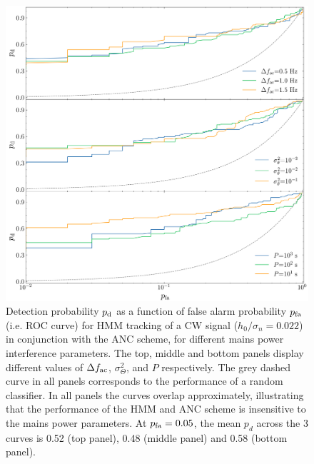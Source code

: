\documentclass[pra,superscriptaddress,reprint,amsmath,amssymb,nofootinbib]{revtex4-2}
\begin{document}
\begin{figure}
	\begin{center}
		\includegraphics[width=\columnwidth]{images/roc_curve_mains_power_params_log}
	\end{center}
	\caption{Detection probability $p_{\rm d}$ as a function of false alarm probability $p_{\rm fa}$ (i.e. ROC curve) for HMM tracking of a CW signal ($h_0 / \sigma_n = 0.022$) in conjunction with the ANC scheme, for different mains power interference parameters. The top, middle and bottom panels display different values of $\Delta f_{\rm ac}$, $\sigma_{\Theta}^2$, and $P$ respectively. The grey dashed curve in all panels corresponds to the performance of a random classifier. In all panels the curves overlap approximately, illustrating that the performance of the HMM and ANC scheme is insensitive to the mains power parameters. At $p_{\rm fa} = 0.05$, the mean $p_{d}$ across the 3 curves is 0.52 (top panel), 0.48 (middle panel) and 0.58 (bottom panel).}
	\label{fig:roc1}
\end{figure}
\end{document}
